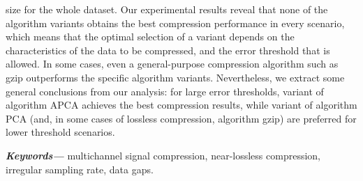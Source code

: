 {size for the whole dataset. Our experimental results reveal that none of the algorithm variants obtains the best compression performance in every scenario, which means that the optimal selection of a variant depends on the characteristics of the data to be compressed, and the error threshold that is allowed. In some cases, even a general-purpose compression algorithm such as gzip outperforms the specific algorithm variants. Nevertheless, we extract some general conclusions from our analysis: for large error thresholds, variant \maskalgo of algorithm APCA achieves the best compression results, while variant \maskalgo of algorithm PCA (and, in some cases of lossless compression, algorithm gzip) are preferred for lower threshold scenarios.

\textbf{\textit{Keywords---}} multichannel signal compression, near-lossless compression, irregular sampling rate, data gaps.

}
\clearpage
